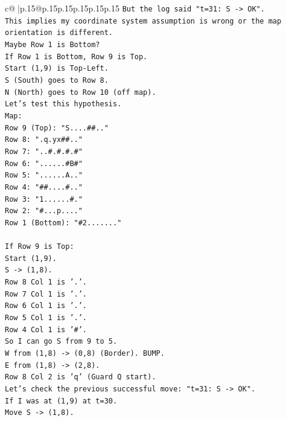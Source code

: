 \documentclass{article}
\begin{document}
{\begin{supertabular}{c@{$\;$}|p{.15\linewidth}@{}p{.15\linewidth}p{.15\linewidth}p{.15\linewidth}p{.15\linewidth}p{.15\linewidth}}
{{{\texttt{But the log said "t=31: S {-}> OK".} \\
\texttt{This implies my coordinate system assumption is wrong or the map orientation is different.} \\
\texttt{Maybe Row 1 is Bottom?} \\
\texttt{If Row 1 is Bottom, Row 9 is Top.} \\
\texttt{Start (1,9) is Top{-}Left.} \\
\texttt{S (South) goes to Row 8.} \\
\texttt{N (North) goes to Row 10 (off map).} \\
\texttt{Let's test this hypothesis.} \\
\texttt{Map:} \\
\texttt{Row 9 (Top): "S....\#\#.."} \\
\texttt{Row 8: ".q.yx\#\#.."} \\
\texttt{Row 7: "..\#.\#.\#.\#"} \\
\texttt{Row 6: "......\#B\#"} \\
\texttt{Row 5: "......A.."} \\
\texttt{Row 4: "\#\#....\#.."} \\
\texttt{Row 3: "1......\#."} \\
\texttt{Row 2: "\#...p...."} \\
\texttt{Row 1 (Bottom): "\#2......."} \\
\\ 
\texttt{If Row 9 is Top:} \\
\texttt{Start (1,9).} \\
\texttt{S {-}> (1,8).} \\
\texttt{Row 8 Col 1 is '.'.} \\
\texttt{Row 7 Col 1 is '.'.} \\
\texttt{Row 6 Col 1 is '.'.} \\
\texttt{Row 5 Col 1 is '.'.} \\
\texttt{Row 4 Col 1 is '\#'.} \\
\texttt{So I can go S from 9 to 5.} \\
\texttt{W from (1,8) {-}> (0,8) (Border). BUMP.} \\
\texttt{E from (1,8) {-}> (2,8).} \\
\texttt{Row 8 Col 2 is 'q' (Guard Q start).} \\
\texttt{Let's check the previous successful move: "t=31: S {-}> OK".} \\
\texttt{If I was at (1,9) at t=30.} \\
\texttt{Move S {-}> (1,8).} \\
}}}
\end{supertabular}}
\end{document}
